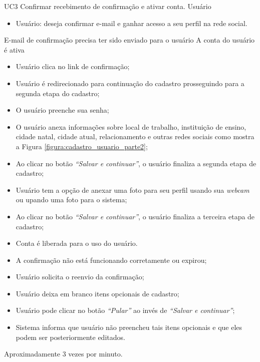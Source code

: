 \casoDeUso
{UC3}
{Confirmar recebimento de confirmação e ativar conta.}
{Usuário}
{
\begin{itemize}
	\item Usuário: deseja confirmar e-mail e ganhar acesso a seu perfil na rede social.
\end{itemize}

}
{E-mail de confirmação precisa ter sido enviado para o usuário}
{A conta do usuário é ativa}
{
\begin{itemize}
	\item Usuário clica no link de confirmação;
	\item Usuário é redirecionado para continuação do cadastro prosseguindo para a segunda etapa do cadastro;	
	\item O usuário preenche sua senha;
	\item O usuário anexa informações sobre local de trabalho, instituição de ensino, cidade natal, cidade atual, relacionamento e outras redes sociais como mostra a Figura \ref{figura:cadastro_usuario_parte2};
	\item Ao clicar no botão \textit{“Salvar e continuar”}, o usuário finaliza a segunda etapa de cadastro;
	\item Usuário tem a opção de anexar uma foto para seu perfil usando sua \textit{webcam} ou upando uma foto para o sistema;
	\item Ao clicar no botão \textit{“Salvar e continuar”}, o usuário finaliza a terceira etapa de cadastro; 		
	\item Conta é liberada para o uso do usuário.		 
\end{itemize}
}
{
\begin{itemize}
	\item A confirmação não está funcionando corretamente ou expirou;
	\item Usuário solicita o reenvio da confirmação;
	
	\item Usuário deixa em branco itens opcionais de cadastro;
	\item Usuário pode clicar no botão \textit{“Pular”} ao invés de \textit{“Salvar e continuar”};
	
	\item Sistema informa que usuário não preencheu tais itens opcionais e que eles podem ser posteriormente editados.
	
\end{itemize}
}
{Aproximadamente 3 vezes por minuto.}
{

}

